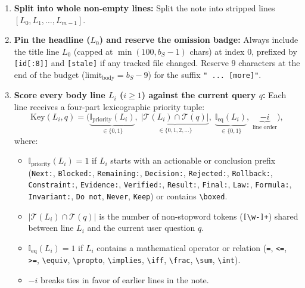 \documentclass[11pt,a4paper]{article}
\begin{document}
\begin{mathbox}
\begin{enumerate}[leftmargin=1.5em,itemsep=3pt]
  \item \textbf{Split into whole non-empty lines:} Split the note into stripped lines $[L_0, L_1, \dots, L_{m-1}]$.
  \item \textbf{Pin the headline ($L_0$) and reserve the omission badge:} Always include the title line $L_0$ (capped at $\min(100, b_S-1)$ chars) at index $0$, prefixed by \texttt{[id[:8]]} and \texttt{[stale]} if any tracked file changed. Reserve $9$ characters at the end of the budget ($\text{limit}_{\text{body}} = b_S - 9$) for the suffix \texttt{" ... [more]"}.
  \item \textbf{Score every body line $L_i$ ($i \ge 1$) against the current query $q$:} Each line receives a four-part lexicographic priority tuple:
  \[
    \text{Key}(L_i, q) = \Big(
      \underbrace{\mathbb{I}_{\text{priority}}(L_i)}_{\in \{0,1\}},\;
      \underbrace{\big|\mathcal{T}(L_i) \cap \mathcal{T}(q)\big|}_{\in \{0,1,2,\dots\}},\;
      \underbrace{\mathbb{I}_{\text{eq}}(L_i)}_{\in \{0,1\}},\;
      \underbrace{-i}_{\text{line order}}
    \Big),
  \]
  where:
  \begin{itemize}[leftmargin=1.2em,itemsep=1pt]
    \item $\mathbb{I}_{\text{priority}}(L_i) = 1$ if $L_i$ starts with an actionable or conclusion prefix (\texttt{Next:}, \texttt{Blocked:}, \texttt{Remaining:}, \texttt{Decision:}, \texttt{Rejected:}, \texttt{Rollback:}, \texttt{Constraint:}, \texttt{Evidence:}, \texttt{Verified:}, \texttt{Result:}, \texttt{Final:}, \texttt{Law:}, \texttt{Formula:}, \texttt{Invariant:}, \texttt{Do not}, \texttt{Never}, \texttt{Keep}) or contains \texttt{\textbackslash boxed}.
    \item $|\mathcal{T}(L_i) \cap \mathcal{T}(q)|$ is the number of non-stopword tokens (\texttt{[\textbackslash w-]+}) shared between line $L_i$ and the current user question $q$.
    \item $\mathbb{I}_{\text{eq}}(L_i) = 1$ if $L_i$ contains a mathematical operator or relation (\texttt{=}, \texttt{<=}, \texttt{>=}, \texttt{\textbackslash equiv}, \texttt{\textbackslash propto}, \texttt{\textbackslash implies}, \texttt{\textbackslash iff}, \texttt{\textbackslash frac}, \texttt{\textbackslash sum}, \texttt{\textbackslash int}).
    \item $-i$ breaks ties in favor of earlier lines in the note.

\end{itemize}
\end{enumerate}
\end{mathbox}
\end{document}
